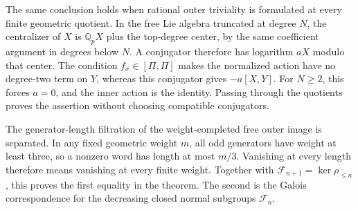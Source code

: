 The same conclusion holds when rational outer triviality is formulated at every finite geometric quotient. In the free Lie algebra truncated at degree \(N\), the centralizer of \(X\) is \(\mathbb Q_pX\) plus the top-degree center, by the same coefficient argument in degrees below \(N\). A conjugator therefore has logarithm \(aX\) modulo that center. The condition \(f_\sigma\in[\Pi,\Pi]\) makes the normalized action have no degree-two term on \(Y\), whereas this conjugator gives \(-a[X,Y]\). For \(N\geq2\), this forces \(a=0\), and the inner action is the identity. Passing through the quotients proves the assertion without choosing compatible conjugators.

The generator-length filtration of the
weight-completed free outer image is separated.
In any fixed geometric weight \(m\), all odd
generators have weight at least three, so a
nonzero word has length at most \(m/3\).
Vanishing at every length therefore means
vanishing at every finite weight.
Together with \(\mathcal F_{n+1}=\ker\rho_{\leq n}\),
this proves the first equality in the theorem.  The second is
the Galois correspondence for the decreasing
closed normal subgroups \(\mathcal F_n\).

